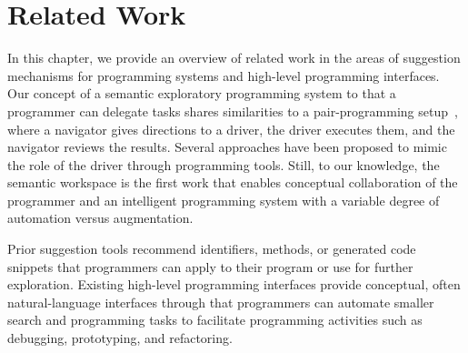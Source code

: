 
\chapter{Related Work}
\label{cha:related_work}

In this chapter, we provide an overview of related work in the areas of suggestion mechanisms for programming systems and high-level programming interfaces.
Our concept of a semantic exploratory programming system to that a programmer can delegate tasks shares similarities to a pair-programming setup~\cite{beck2000extreme}, where a navigator gives directions to a driver, the driver executes them, and the navigator reviews the results.
Several approaches have been proposed to mimic the role of the driver through programming tools.
Still, to our knowledge, the semantic workspace is the first work that enables conceptual collaboration of the programmer and an intelligent programming system with a variable degree of automation versus augmentation.


\begin{summary}
	Prior suggestion tools recommend identifiers, methods, or generated code snippets that programmers can apply to their program or use for further exploration.
	Existing high-level programming interfaces provide conceptual, often natural-language interfaces through that programmers can automate smaller search and programming tasks to facilitate programming activities such as debugging, prototyping, and refactoring.
\end{summary}
